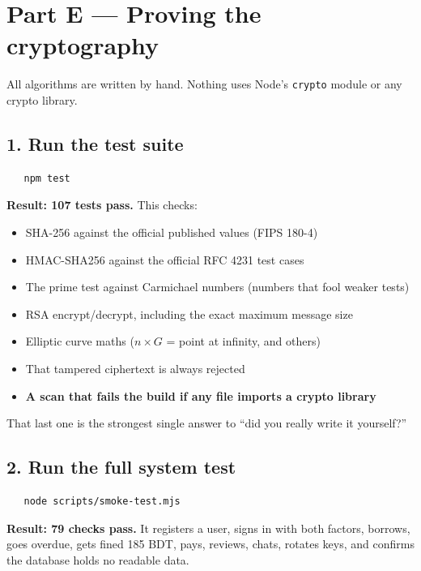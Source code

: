 \documentclass[11pt]{article}
\begin{document}
\section{Part E --- Proving the cryptography}

All algorithms are written by hand. Nothing uses Node's \texttt{crypto}
module or any crypto library.

\subsection*{1. Run the test suite}

\begin{verbatim}
   npm test
\end{verbatim}

\textbf{Result: 107 tests pass.} This checks:

\begin{itemize}[leftmargin=1.4cm, itemsep=2pt]
  \item SHA-256 against the official published values (FIPS 180-4)
  \item HMAC-SHA256 against the official RFC 4231 test cases
  \item The prime test against Carmichael numbers (numbers that fool weaker tests)
  \item RSA encrypt/decrypt, including the exact maximum message size
  \item Elliptic curve maths ($n \times G$ = point at infinity, and others)
  \item That tampered ciphertext is always rejected
  \item \textbf{A scan that fails the build if any file imports a crypto library}
\end{itemize}

That last one is the strongest single answer to ``did you really write it
yourself?''

\subsection*{2. Run the full system test}

\begin{verbatim}
   node scripts/smoke-test.mjs
\end{verbatim}

\textbf{Result: 79 checks pass.} It registers a user, signs in with both
factors, borrows, goes overdue, gets fined 185 BDT, pays, reviews, chats,
rotates keys, and confirms the database holds no readable data.
\end{document}

